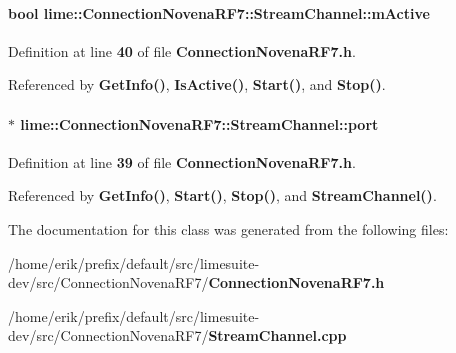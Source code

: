 \paragraph[{m\+Active}]{\setlength{\rightskip}{0pt plus 5cm}bool lime\+::\+Connection\+Novena\+R\+F7\+::\+Stream\+Channel\+::m\+Active\hspace{0.3cm}{\ttfamily [protected]}}\label{classlime_1_1ConnectionNovenaRF7_1_1StreamChannel_a6214f48b05f767d5c2156f0bc53c08af}


Definition at line {\bf 40} of file {\bf Connection\+Novena\+R\+F7.\+h}.



Referenced by {\bf Get\+Info()}, {\bf Is\+Active()}, {\bf Start()}, and {\bf Stop()}.

\paragraph[{port}]{$\ast$ lime\+::\+Connection\+Novena\+R\+F7\+::\+Stream\+Channel\+::port\hspace{0.3cm}{\ttfamily [protected]}}\label{classlime_1_1ConnectionNovenaRF7_1_1StreamChannel_ad636b496cc1e4b300672cdfc1ee2e3fd}


Definition at line {\bf 39} of file {\bf Connection\+Novena\+R\+F7.\+h}.



Referenced by {\bf Get\+Info()}, {\bf Start()}, {\bf Stop()}, and {\bf Stream\+Channel()}.



The documentation for this class was generated from the following files\+:\begin{DoxyCompactItemize}
\item 
/home/erik/prefix/default/src/limesuite-\/dev/src/\+Connection\+Novena\+R\+F7/{\bf Connection\+Novena\+R\+F7.\+h}\item 
/home/erik/prefix/default/src/limesuite-\/dev/src/\+Connection\+Novena\+R\+F7/{\bf Stream\+Channel.\+cpp}\end{DoxyCompactItemize}
